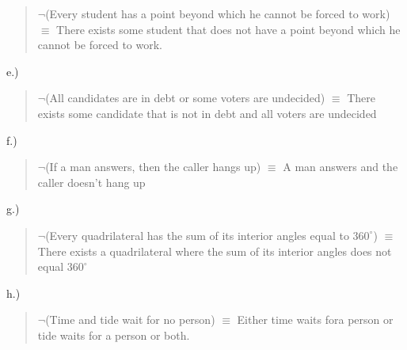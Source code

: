 \documentclass{report}
\begin{document}
    \begin{quote}
       $\neg $(Every student has a point beyond which he cannot be forced to work) $\equiv$ There exists some student that does not have a point beyond which he cannot be forced to work. 
    \end{quote}
    \bigbreak \noindent 
    e.)
    \begin{quote}
      $\neg$(All candidates are in debt or some voters are undecided)  $\equiv$ There exists some candidate that is not in debt and all voters are undecided
    \end{quote}
    \bigbreak \noindent 
    f.)
    \begin{quote}
       $\neg$(If a man answers, then the caller hangs up) $\equiv$ A man answers and the caller doesn't hang up 
    \end{quote}
    \bigbreak \noindent 
    g.)
    \begin{quote}
       $\neg$(Every quadrilateral has the sum of its interior angles equal to $360^{\circ}$) $\equiv$ There exists a quadrilateral where the sum of its interior angles does not equal $360^{\circ}$
    \end{quote}
    \bigbreak \noindent 
    h.) 
    \begin{quote}
       $\neg$(Time and tide wait for no person) $\equiv$ Either time waits fora person or tide waits for a person or both. 
    \end{quote}
    
    
    
    
    
    
    
    

    









 
\end{document}
